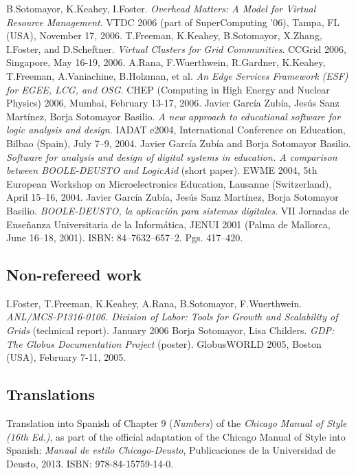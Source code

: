 \documentclass{resume}
\begin{document}
\begin{category}{}
\citembullet B.Sotomayor, K.Keahey, I.Foster. \emph{Overhead Matters: A Model for Virtual Resource Management}. VTDC 2006 (part of SuperComputing '06), Tampa, FL (USA), November 17, 2006. 
\citembullet T.Freeman, K.Keahey, B.Sotomayor, X.Zhang, I.Foster, and D.Scheftner. \emph{Virtual Clusters for Grid Communities}. CCGrid 2006, Singapore, May 16-19, 2006.
\citembullet A.Rana, F.Wuerthwein, R.Gardner, K.Keahey, T.Freeman, A.Vaniachine, B.Holzman, et al. \emph{An Edge Services Framework (ESF) for EGEE, LCG, and OSG}. CHEP (Computing in High Energy and Nuclear Physics) 2006, Mumbai, February 13-17, 2006.
\citembullet Javier García Zubía, Jesús Sanz Martínez, Borja Sotomayor Basilio. \emph{A new approach to educational software for logic analysis and design}. IADAT e2004, International Conference on Education, Bilbao (Spain), July 7--9, 2004.
\citembullet Javier García Zubía and Borja Sotomayor Basilio. \emph{Software for analysis and design of digital systems in education. A comparison between BOOLE-DEUSTO and LogicAid} (short paper). EWME 2004,  5th European Workshop on Microelectronics Education, Lausanne (Switzerland), April 15--16, 2004.
\citembullet Javier García Zubía, Jesús Sanz Martínez, Borja Sotomayor Basilio. \emph{BOOLE-DEUSTO, la aplicación para
sistemas digitales}. VII Jornadas de Enseñanza Universitaria de la
Informática, JENUI 2001 (Palma de Mallorca, June 16--18, 2001).
ISBN: 84--7632--657--2. Pgs. 417--420.
\end{category}

\subsection*{Non-refereed work}
\begin{category}{}
\citembullet I.Foster, T.Freeman, K.Keahey, A.Rana, B.Sotomayor, F.Wuerthwein. \emph{ANL/MCS-P1316-0106. Division of Labor: Tools for Growth and Scalability of Grids} (technical report). January 2006
\citembullet Borja Sotomayor, Lisa Childers. \emph{GDP: The Globus Documentation Project} (poster). GlobusWORLD 2005, Boston (USA), February 7-11, 2005.
\end{category}

\subsection*{Translations}
\begin{category}{}
\citembullet Translation into Spanish of Chapter 9 (\emph{Numbers}) of the \emph{Chicago Manual of Style (16th Ed.)}, as part of the official adaptation of the Chicago Manual of Style into Spanish: \emph{Manual de estilo Chicago-Deusto}, Publicaciones de la Universidad de Deusto, 2013. ISBN: 978-84-15759-14-0.
\end{category}
\end{document}
